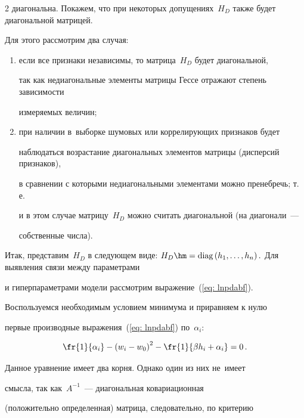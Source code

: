 \begin{multicols}{2}
диагональна. Покажем, что при некоторых допущениях~$H_D$ также будет диагональной матрицей. 

Для этого рассмотрим два случая:

\begin{enumerate}[(1)]

  \item если все признаки независимы, то матрица~$H_D$ будет диагональной, 

  так как недиагональные элементы матрицы Гессе отражают степень зависимости 

  измеряемых величин;

  \item при наличии в~выборке шумовых или коррелирующих признаков будет 

  наблюдаться возрас\-та\-ние диагональных элементов матрицы (дисперсий признаков), 

  в сравнении с которыми недиагональными элементами можно пре\-неб\-речь; т.\,е.\ 

  и в этом случае матрицу~$H_D$ можно считать диагональной (на диагонали~--- 

  собственные числа).

\end{enumerate}



Итак, представим~$H_D$ в следующем виде: $H_D \hm=

\mathrm{diag}\left(h_1, \ldots ,h_n\right).$ Для выявления связи между параметрами

и гиперпараметрами модели рас\-смот\-рим выражение~(\ref{eq: lnpdabf}).

Воспользуемся необходимым условием минимума и приравняем к нулю

первые производные выражения~(\ref{eq: lnpdabf}) по~$\alpha_i$:

\begin{equation*}


\fr{1}{\alpha_i}-\left(w_{i}-w_{0}\right)^2-\fr{1}{\beta h_i+\alpha_i}=0\,.

\end{equation*}



Данное уравнение имеет два корня. Однако один из них не~имеет

смысла, так как~$A^{-1}$~--- диагональная ковариационная

(положительно определенная) матрица, следовательно, по критерию


\end{multicols}
